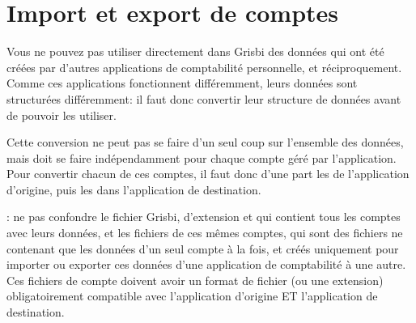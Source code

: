 

\chapter{Import et export de comptes\label{importexport}}

Vous ne pouvez pas utiliser directement dans Grisbi des données qui ont été créées par d'autres applications de comptabilité personnelle, et réciproquement. Comme ces applications fonctionnent différemment, leurs données sont structurées différemment: il faut donc convertir leur structure de données avant de pouvoir les utiliser. 

Cette conversion ne peut pas se faire d'un seul coup sur l'ensemble des données, mais doit se faire indépendamment pour chaque compte géré par l'application. Pour convertir chacun de ces comptes, il faut donc d'une part les  de l'application d'origine, puis les  dans l'application de destination.


\Note{}: ne pas confondre le fichier Grisbi, d'\gls{extension}  et qui contient tous les comptes avec leurs données, et les fichiers de ces mêmes comptes, qui sont des fichiers ne contenant que les données d'un seul compte à la fois, et créés uniquement pour importer ou exporter ces données d'une application de comptabilité à une autre. Ces fichiers de compte doivent avoir un \gls{format de fichier} (ou une \gls{extension}) obligatoirement compatible avec l'application d'origine ET l'application de destination.



